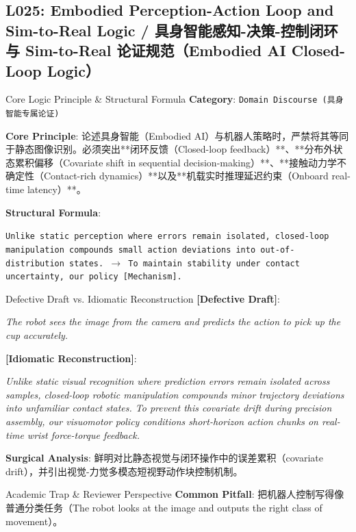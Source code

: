 \subsection{L025: Embodied Perception-Action Loop and Sim-to-Real Logic / 具身智能感知-决策-控制闭环与 Sim-to-Real 论证规范（Embodied AI Closed-Loop Logic）}\label{sec:logic:L025}
\begin{ConceptBox}{Core Logic Principle \& Structural Formula}
\textbf{Category}: \texttt{Domain Discourse (具身智能专属论证)}\par\vspace{3pt}
\textbf{Core Principle}: 论述具身智能（Embodied AI）与机器人策略时，严禁将其等同于静态图像识别。必须突出**闭环反馈（Closed-loop feedback）**、**分布外状态累积偏移（Covariate shift in sequential decision-making）**、**接触动力学不确定性（Contact-rich dynamics）**以及**机载实时推理延迟约束（Onboard real-time latency）**。\par\vspace{4pt}
\textbf{Structural Formula}:\par\noindent\texttt{Unlike static perception where errors remain isolated, closed-loop manipulation compounds small action deviations into out-of-distribution states. $\to$ To maintain stability under contact uncertainty, our policy [Mechanism].}
\end{ConceptBox}
\begin{ExampleBox}{Defective Draft vs. Idiomatic Reconstruction}
\textbf{\color{TargetHighlight}[Defective Draft]}:\par\textit{The robot sees the image from the camera and predicts the action to pick up the cup accurately.}\par\vspace{4pt}
\textbf{\color{AcadNavy}[Idiomatic Reconstruction]}:\par\textit{Unlike static visual recognition where prediction errors remain isolated across samples, closed-loop robotic manipulation compounds minor trajectory deviations into unfamiliar contact states. To prevent this covariate drift during precision assembly, our visuomotor policy conditions short-horizon action chunks on real-time wrist force-torque feedback.}\par\vspace{4pt}
\textbf{Surgical Analysis}: 鲜明对比静态视觉与闭环操作中的误差累积（covariate drift），并引出视觉-力觉多模态短视野动作块控制机制。
\end{ExampleBox}
\begin{TipBox}{Academic Trap \& Reviewer Perspective}
\textbf{Common Pitfall}: 把机器人控制写得像普通分类任务（The robot looks at the image and outputs the right class of movement）。
\end{TipBox}
\vspace{6pt}
